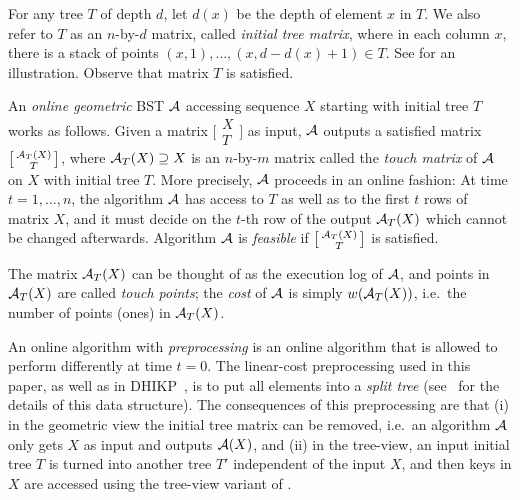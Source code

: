 For any tree $T$ of depth $d$, let $d(x)$ be the depth of element
$x$ in $T$. We also refer to $T$ as an $n$-by-$d$ matrix, called
\emph{initial tree matrix}, where in each column $x$, there is a
stack of points $(x,1),\dots,(x,d-d(x)+1)\in T$. See  for an illustration. 
Observe that matrix $T$ is satisfied.

An \emph{online geometric} BST ${\mathcal{A}}$ accessing sequence $X$ starting
with initial tree $T$ works as follows. Given a matrix
$\bigl[ \begin{smallmatrix} 
  X\\
  T 
\end{smallmatrix} \bigr]$ 
as input, ${\mathcal{A}}$ outputs a satisfied matrix
$\bigl[ \begin{smallmatrix} 
  {\mathcal{A}}_{T}(X)\\
  T 
\end{smallmatrix} \bigr]$,
where ${\mathcal{A}}_{T}(X)\supseteq X$ is an $n$-by-$m$ matrix called
the \emph{touch matrix} of ${\mathcal{A}}$ on $X$ with initial tree $T$.
More precisely, ${\mathcal{A}}$ proceeds in an online fashion: At time $t=1,\ldots, n$, the algorithm ${\mathcal{A}}$ has access to $T$ as well as to the first $t$ rows of matrix $X$, and it must decide on the $t$-th row of the output ${\mathcal{A}}_T(X)$ which cannot be changed afterwards. 
Algorithm ${\mathcal{A}}$ is {\em feasible} if  
$\bigl[ \begin{smallmatrix} 
{\mathcal{A}}_{T}(X)\\
  T 
\end{smallmatrix} \bigr]$ is satisfied.  

The matrix ${\mathcal{A}}_{T}(X)$ can be thought of as the execution log of ${\mathcal{A}}$, and points in ${\mathcal{A}}_{T}(X)$ are called \emph{touch points}; the \emph{cost} of
${\mathcal{A}}$ is simply $w({\mathcal{A}}_T(X))$, i.e.\ the number of points (ones) in ${\mathcal{A}}_{T}(X)$.

An online algorithm with {\em preprocessing} is an online algorithm that is allowed to perform differently at time $t=0$.  
The linear-cost preprocessing used in this paper, as well as in DHIKP~\cite{DHIKP09}, is to put all elements into a \emph{split tree} (see~\cite{DHIKP09} for the details of this data structure). The consequences of this preprocessing are that (i) in the geometric view the initial tree matrix can be removed, i.e.\ an algorithm ${\mathcal{A}}$ only gets $X$ as input and outputs ${\mathcal{A}}(X)$, and (ii) in the tree-view, an input initial tree $T$ is turned into another tree $T'$ independent of the input $X$, and then keys in $X$ are accessed using the tree-view variant of \greedy. 

